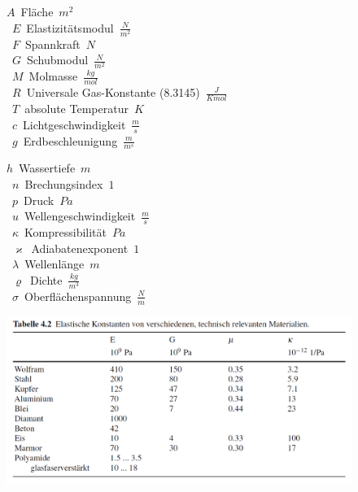 \begin{center}
	\begin{minipage}{0.3\textwidth}
		\unit{$A$}{Fläche}{$m^2$} \\
		\unit{$E$}{Elastizitätsmodul}{$\frac{N}{m^2}$} \\
		\unit{$F$}{Spannkraft}{$N$} \\
		\unit{$G$}{Schubmodul}{$\frac{N}{m^2}$} \\
		\unit{$M$}{Molmasse}{$\frac{kg}{mol}$} \\
		\unit{$R$}{Universale Gas-Konstante (8.3145)}{$\frac{J}{K mol}$} \\
		\unit{$T$}{absolute Temperatur}{$K$} \\
		\unit{$c$}{Lichtgeschwindigkeit}{$\frac{m}{s}$} \\
		\unit{$g$}{Erdbeschleunigung}{$\frac{m}{m^s}$}
	\end{minipage}%
	\begin{minipage}{0.3\textwidth}
		\unit{$h$}{Wassertiefe}{$m$} \\
		\unit{$n$}{Brechungsindex}{$1$} \\
		\unit{$p$}{Druck}{$Pa$} \\
		\unit{$u$}{Wellengeschwindigkeit}{$\frac{m}{s}$} \\
		\unit{$\kappa$}{Kompressibilität}{$Pa$} \\
		\unit{$\varkappa$}{Adiabatenexponent}{$1$} \\
		\unit{$\lambda$}{Wellenlänge}{$m$} \\
		\unit{$\varrho$}{Dichte}{$\frac{kg}{m^3}$} \\
		\unit{$\sigma$}{Oberflächenspannung}{$\frac{N}{m}$}
	\end{minipage}
\end{center}

\begin{center}
	\includegraphics[height=5.5cm,keepaspectratio=true]{Images/elastische_konstanten.png}
\end{center}


